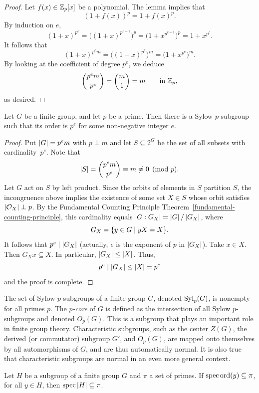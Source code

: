 \begin{proof} Let $f(x)\in\mathbb{Z}_p[x]$ be a polynomial. The lemma implies that
$$
    (1+f(x))^p = 1 + f(x)^p.
$$
By induction on $e$,
$$
    (1+x)^{p^e}=\big((1+x)^{p^{e-1}}\big)^p = (1 + x^{p^{e-1}}\big)^p = 1 + x^{p^e}.
$$
It follows that
$$
    (1+x)^{p^em} = \big((1+x)^{p^e}\big)^m = \big(1 + x^{p^e}\big)^m.
$$
By looking at the coefficient of degree $p^e$, we deduce
$$
    \binom{p^em}{p^e} = \binom m1=m\qquad\textrm{in }\mathbb{Z}_p,
$$
as desired.  \end{proof}

\begin{thm}\label{sylow-e} {\upshape[Sylow-E]}
     Let\/ $G$ be a finite group, and let\/ $p$ be a prime. Then there is a Sylow\/ $p$-subgroup such that its order is\/ $p^e$ for some non-negative integer\/ $e$.
\end{thm}

\begin{proof} Put $\left\vert{G}\right\vert=p^em$ with $p\perp m$ and let $S\subseteq 2^G$ be the set of all subsets with cardinality~$p^e$. Note that
$$
    \left\vert{S}\right\vert=\binom{p^em}{p^e} \equiv m \not\equiv 0\pmod p.
$$
Let $G$ act on $S$ by left product. Since the orbits of elements in $S$ partition $S$, the incongruence above implies the existence of some set $X\in S$ whose orbit satisfies $\left\vert{{\cal O}_X}\right\vert\perp p$. By the Fundamental Counting Principle Theorem~\ref{fundamental-counting-principle}, this cardinality equals $\left\vert{G:G_X}\right\vert=\left\vert{G}\right\vert/\left\vert{G_X}\right\vert$, where
$$
    G_X = \{y\in G\mid yX=X\}.
$$
It follows that $p^e\mid\left\vert{G_X}\right\vert$ (actually, $e$ is the exponent of $p$ in $\left\vert{G_X}\right\vert$). Take $x\in X$. Then $G_Xx\subseteq X$. In particular, $\left\vert{G_X}\right\vert\le\left\vert{X}\right\vert$. Thus,
$$
    p^e\mid\left\vert{G_X}\right\vert \le\left\vert{X}\right\vert= p^e
$$
and the proof is complete.  \end{proof}

\bigskip

The set of Sylow $p$-subgroups of a finite group $G$, denoted ${\rm Syl}_p(G)$, is nonempty for all primes $p$. The \textsl{$p$-core} of $G$ is defined as the intersection of all Sylow $p$-subgroups and denoted $O_p(G)$. This is a subgroup that plays an important role in finite group theory. Characteristic subgroups, such as the center $Z(G)$, the derived (or commutator) subgroup $G'$, and $O_p(G)$, are mapped onto themselves by all automorphisms of $G$, and are thus automatically normal. It is also true that characteristic subgroups are normal in an even more general context.

\begin{cor}\label{elementwise-pi}
    Let $H$ be a subgroup of a finite group $G$ and $\pi$ a set of primes. If\/ $\operatorname{spec}{\rm ord}(y)\subseteq\pi$, for all $y\in H$, then $\operatorname{spec}\left\vert{H}\right\vert\subseteq\pi$.
\end{cor}


